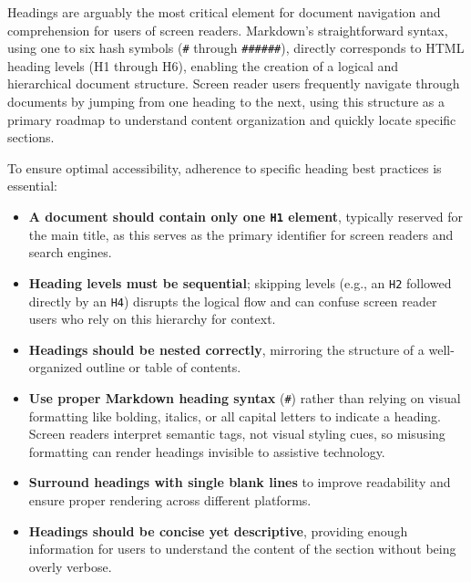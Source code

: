 Headings are arguably the most critical element for document navigation and comprehension for users of screen readers. \cite{ReciteMe,DSU,SmashingMagazine,TestDevLab,MDNHTML,UniversalDesign,UNIWeb,GitLabDocs,MarkdownToolbox,TestPros,LancasterLatex} Markdown's straightforward syntax, using one to six hash symbols (\texttt{\#} through \texttt{\#\#\#\#\#\#}), directly corresponds to HTML heading levels (H1 through H6), enabling the creation of a logical and hierarchical document structure. \cite{SmashingMagazine,MarkdownGuide} Screen reader users frequently navigate through documents by jumping from one heading to the next, using this structure as a primary roadmap to understand content organization and quickly locate specific sections. \cite{ReciteMe,DSU,SmashingMagazine,MDNHTML}

To ensure optimal accessibility, adherence to specific heading best practices is essential:

\begin{itemize}
    \item \textbf{A document should contain only one \texttt{H1} element}, typically reserved for the main title, as this serves as the primary identifier for screen readers and search engines. \cite{DSU,UNIWeb,GitLabDocs}
    \item \textbf{Heading levels must be sequential}; skipping levels (e.g., an \texttt{H2} followed directly by an \texttt{H4}) disrupts the logical flow and can confuse screen reader users who rely on this hierarchy for context. \cite{DSU,TestDevLab,GitLabDocs,TestPros}
    \item \textbf{Headings should be nested correctly}, mirroring the structure of a well-organized outline or table of contents. \cite{GitLabDocs,LancasterLatex}
    \item \textbf{Use proper Markdown heading syntax} (\texttt{\#}) rather than relying on visual formatting like bolding, italics, or all capital letters to indicate a heading. \cite{DSU,UniversalDesign,TestPros} Screen readers interpret semantic tags, not visual styling cues, so misusing formatting can render headings invisible to assistive technology. \cite{UniversalDesign}
    \item \textbf{Surround headings with single blank lines} to improve readability and ensure proper rendering across different platforms. \cite{MSPowerShellMarkdown}
    \item \textbf{Headings should be concise yet descriptive}, providing enough information for users to understand the content of the section without being overly verbose. \cite{SmashingMagazine,UNIWeb}
\end{itemize}

